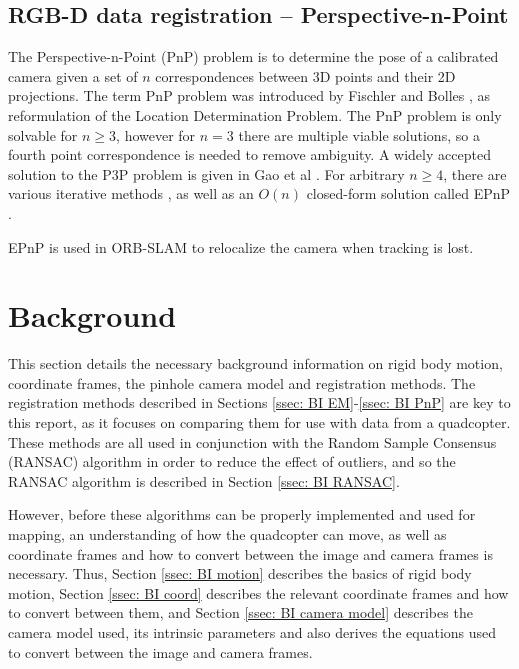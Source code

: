 \documentclass[12pt,a4paper]{article}
\begin{document}
  \subsection{RGB-D data registration -- Perspective-n-Point}
    \label{ssec: PnP}
    The Perspective-n-Point (PnP) problem is to determine the pose of a calibrated camera given a set of $n$ correspondences between 3D points and their 2D projections. The term PnP problem was introduced by Fischler and Bolles \cite{fischler1981random}, as reformulation of the Location Determination Problem. The PnP problem is only solvable for $n \geq 3$, however for $n=3$ there are multiple viable solutions, so a fourth point correspondence is needed to remove ambiguity. A widely accepted solution to the P3P problem is given in Gao et al \cite{gao2003complete}. For arbitrary $n\geq 4$, there are various iterative methods \cite{oberkampf1996iterative,haralick1989pose}, as well as an $O(n)$ closed-form solution called EPnP \cite{lepetit2009epnp}.    
     
    EPnP is used in ORB-SLAM \cite{mur2015orb} to relocalize the camera when tracking is lost.


\section{Background}
  \label{sec: BI}
  This section details the necessary background information on rigid body motion, coordinate frames, the pinhole camera model and registration methods. The registration methods described in Sections \ref{ssec: BI EM}-\ref{ssec: BI PnP} are key to this report, as it focuses on comparing them for use with data from a quadcopter. These methods are all used in conjunction with the Random Sample Consensus (RANSAC) algorithm in order to reduce the effect of outliers, and so the RANSAC algorithm is described in Section \ref{ssec: BI RANSAC}.
   
  However, before these algorithms can be properly implemented and used for mapping, an understanding of how the quadcopter can move, as well as coordinate frames and how to convert between the image and camera frames is necessary. Thus, Section \ref{ssec: BI motion} describes the basics of rigid body motion, Section \ref{ssec: BI coord} describes the relevant coordinate frames and how to convert between them, and Section \ref{ssec: BI camera model} describes the camera model used, its intrinsic parameters and also derives the equations used to convert between the image and camera frames.
   
\end{document}
